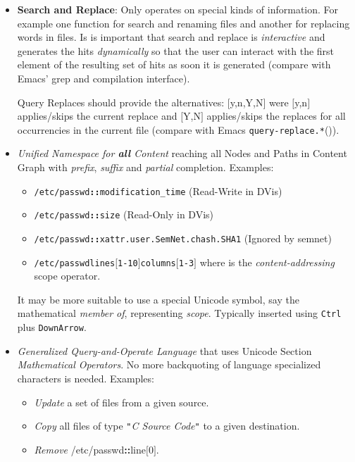 \documentclass[a4paper,10pt,twocolumn]{article}
\begin{document}
\begin{itemize}
\item \textbf{Search and Replace}: Only operates on special kinds of
  information. For example one function for search and renaming files and
  another for replacing words in files. Is is important that search and replace
  is \emph{interactive} and generates the hits \emph{dynamically} so that the
  user can interact with the first element of the resulting set of hits as soon
  it is generated (compare with Emacs' grep and compilation interface).

  Query Replaces should provide the alternatives: \mbox{$[$}y,n,Y,N\mbox{$]$}
  were \mbox{$[$}y,n\mbox{$]$} applies/skips the current replace and
  \mbox{$[$}Y,N\mbox{$]$} applies/skips the replaces for all occurrencies in the
  current file (compare with Emacs \texttt{query-replace.*}()).
\item \emph{Unified Namespace for \textbf{all} Content} reaching all Nodes and
  Paths in Content Graph with \emph{prefix}, \emph{suffix} and \emph{partial}
  completion. Examples:
  \begin{itemize}
  \item \texttt{/etc/passwd\textbf{::}modification_time} (Read-Write in DVis)
  \item \texttt{/etc/passwd\textbf{::}size} (Read-Only in DVis)
  \item \texttt{/etc/passwd\textbf{::}xattr.user.SemNet.chash.SHA1} (Ignored by
    semnet)
  \item
    \texttt{/etc/passwd\textbf{{}}lines\mbox{$[$}1-10\mbox{$]$}\textbf{{}}columns\mbox{$[$}1-3\mbox{$]$}}
    where \textbf{{}} is the \emph{content-addressing} scope operator.
  \end{itemize} It may be more suitable to use a special Unicode symbol, say the
  mathematical \emph{member of}, representing \emph{scope}. Typically inserted
  using \texttt{Ctrl} plus \texttt{DownArrow}.
\item \emph{Generalized Query-and-Operate Language} that uses Unicode Section
  \emph{Mathematical Operators}. No more backquoting of language specialized
  characters is needed. Examples:
  \begin{itemize}
  \item \emph{Update} a set of files from a given source.
  \item \emph{Copy} all files of type \emph{\texttt{{}"{}}C Source
      Code\texttt{{}"{}}} to a given destination.
  \item \emph{Remove} /etc/passwd\textbf{::}line\mbox{$[$}0\mbox{$]$}.

\end{itemize}
\end{itemize}
\end{document}
